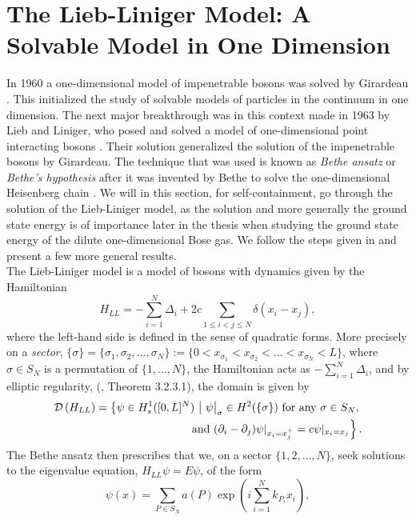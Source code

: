 \section{The Lieb-Liniger Model: A Solvable Model in One Dimension} \label{SectionLiebLinigerModel}
In 1960 a one-dimensional model of impenetrable bosons was solved by Girardeau \cite{girardeau1960relationship}. This initialized the study of solvable models of particles in the continuum in one dimension. The next major breakthrough was in this context made in 1963 by Lieb and Liniger, who posed and solved a model of one-dimensional point interacting bosons \cite{lieb1963exact}. Their solution generalized the solution of the impenetrable bosons by Girardeau. The technique that was used is known as \emph{Bethe ansatz} or \emph{Bethe's hypothesis} after it was invented by Bethe to solve the one-dimensional Heisenberg chain \cite{bethe1931theorie}. We will in this section, for self-containment, go through the solution of the Lieb-Liniger model, as the solution and more generally the ground state energy is of importance later in the thesis when studying the ground state energy of the dilute one-dimensional Bose gas. We follow the steps given in \cite{lieb1963exact} and present a few more general results.\\
The Lieb-Liniger model is a model of bosons with dynamics given by the Hamiltonian \begin{equation}
H_{LL}=-\sum_{i=1}^{N}\Delta_i+2c \sum_{1\leq i<j\leq N}\delta(x_i-x_j),
\end{equation}
where the left-hand side is defined in the sense of quadratic forms. More precisely on a \emph{sector}, $\{\sigma\}=\{\sigma_1,\sigma_2,\ldots,\sigma_N\}:=\{0< x_{\sigma_1}< x_{\sigma_2} < \ldots < x_{\sigma_N}< L\} $, where $ \sigma\in S_N $ is a permutation of $ \{1,\ldots,N\} $, the Hamiltonian acts as $ -\sum_{i=1}^{N}\Delta_i $, and by elliptic regularity, (\cite{grisvard2011elliptic}, Theorem 3.2.3.1), the domain is given by \begin{equation*}
	\begin{aligned}
	\dom{H_{LL}}=\left\{\psi\in H_s^1([0,L]^N)\ \middle\vert\ \psi\big\rvert_{\sigma}\in H^2(\{\sigma\})\text{ for any }\sigma\in S_{N},\right.\\ \left. \text{ and } (\partial_i-\partial_j)\psi\rvert_{x_i=x_j^+}=c\psi\rvert_{x_i=x_j}\right\}.
	\end{aligned}
\end{equation*}
The Bethe ansatz then prescribes that we, on a sector $ \{1,2,\ldots,N\} $, seek solutions to the eigenvalue equation, $ H_{LL}\psi=E\psi $, of the form\begin{equation}\label{EqBetheAnsatz}
\psi(x)=\sum_{P\in S_N} a(P)\exp\left(i\sum_{i=1}^{N}k_{P_i}x_i\right),
\end{equation}
